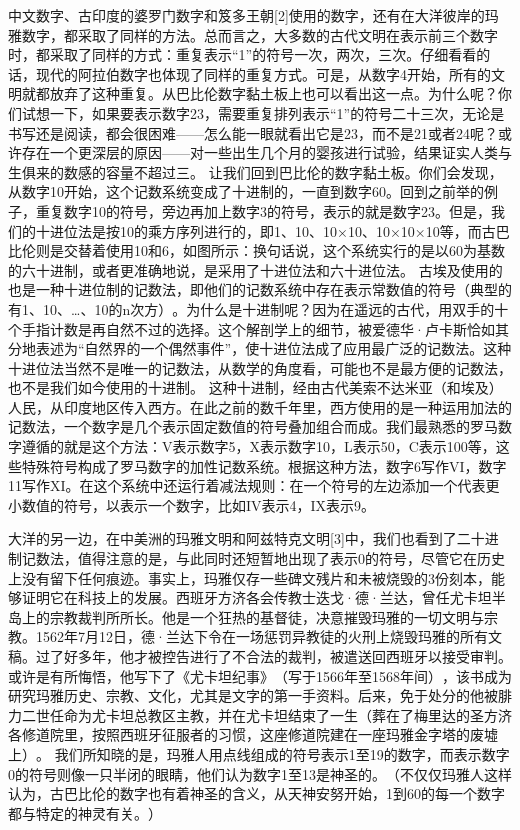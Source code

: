 中文数字、古印度的婆罗门数字和笈多王朝[2]使用的数字，还有在大洋彼岸的玛雅数字，都采取了同样的方法。总而言之，大多数的古代文明在表示前三个数字时，都采取了同样的方式：重复表示“1”的符号一次，两次，三次。仔细看看的话，现代的阿拉伯数字也体现了同样的重复方式。可是，从数字4开始，所有的文明就都放弃了这种重复。从巴比伦数字黏土板上也可以看出这一点。为什么呢？你们试想一下，如果要表示数字23，需要重复排列表示“1”的符号二十三次，无论是书写还是阅读，都会很困难——怎么能一眼就看出它是23，而不是21或者24呢？或许存在一个更深层的原因——对一些出生几个月的婴孩进行试验，结果证实人类与生俱来的数感的容量不超过三。
让我们回到巴比伦的数字黏土板。你们会发现，从数字10开始，这个记数系统变成了十进制的，一直到数字60。回到之前举的例子，重复数字10的符号，旁边再加上数字3的符号，表示的就是数字23。但是，我们的十进位法是按10的乘方序列进行的，即1、10、10×10、10×10×10等，而古巴比伦则是交替着使用10和6，如图所示：换句话说，这个系统实行的是以60为基数的六十进制，或者更准确地说，是采用了十进位法和六十进位法。
古埃及使用的也是一种十进位制的记数法，即他们的记数系统中存在表示常数值的符号（典型的有1、10、…、10的n次方）​。为什么是十进制呢？因为在遥远的古代，用双手的十个手指计数是再自然不过的选择。这个解剖学上的细节，被爱德华·卢卡斯恰如其分地表述为“自然界的一个偶然事件”​，使十进位法成了应用最广泛的记数法。这种十进位法当然不是唯一的记数法，从数学的角度看，可能也不是最方便的记数法，也不是我们如今使用的十进制。
这种十进制，经由古代美索不达米亚（和埃及）人民，从印度地区传入西方。在此之前的数千年里，西方使用的是一种运用加法的记数法，一个数字是几个表示固定数值的符号叠加组合而成。我们最熟悉的罗马数字遵循的就是这个方法：V表示数字5，X表示数字10，L表示50，C表示100等，这些特殊符号构成了罗马数字的加性记数系统。根据这种方法，数字6写作VI，数字11写作XI。在这个系统中还运行着减法规则：在一个符号的左边添加一个代表更小数值的符号，以表示一个数字，比如IV表示4，IX表示9。


大洋的另一边，在中美洲的玛雅文明和阿兹特克文明[3]中，我们也看到了二十进制记数法，值得注意的是，与此同时还短暂地出现了表示0的符号，尽管它在历史上没有留下任何痕迹。事实上，玛雅仅存一些碑文残片和未被烧毁的3份刻本，能够证明它在科技上的发展。西班牙方济各会传教士迭戈·德·兰达，曾任尤卡坦半岛上的宗教裁判所所长。他是一个狂热的基督徒，决意摧毁玛雅的一切文明与宗教。1562年7月12日，德·兰达下令在一场惩罚异教徒的火刑上烧毁玛雅的所有文稿。过了好多年，他才被控告进行了不合法的裁判，被遣送回西班牙以接受审判。或许是有所悔悟，他写下了《尤卡坦纪事》​（写于1566年至1568年间）​，该书成为研究玛雅历史、宗教、文化，尤其是文字的第一手资料。后来，免于处分的他被腓力二世任命为尤卡坦总教区主教，并在尤卡坦结束了一生（葬在了梅里达的圣方济各修道院里，按照西班牙征服者的习惯，这座修道院建在一座玛雅金字塔的废墟上）​。
我们所知晓的是，玛雅人用点线组成的符号表示1至19的数字，而表示数字0的符号则像一只半闭的眼睛，他们认为数字1至13是神圣的。​（不仅仅玛雅人这样认为，古巴比伦的数字也有着神圣的含义，从天神安努开始，1到60的每一个数字都与特定的神灵有关。​）

